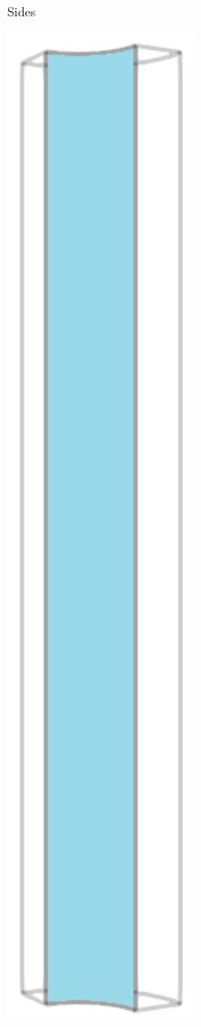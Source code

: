 \begin{figure}[!htb]
\begin{subfigure}[b]{0.16\textwidth}
    \caption{Sides}
  \end{subfigure}
  \begin{subfigure}[b]{0.16\textwidth}
    \centering
    \includegraphics[width=0.6\textwidth]{Chapter5/figures/spallation/geometry_inner}

\end{subfigure}
\end{figure}
